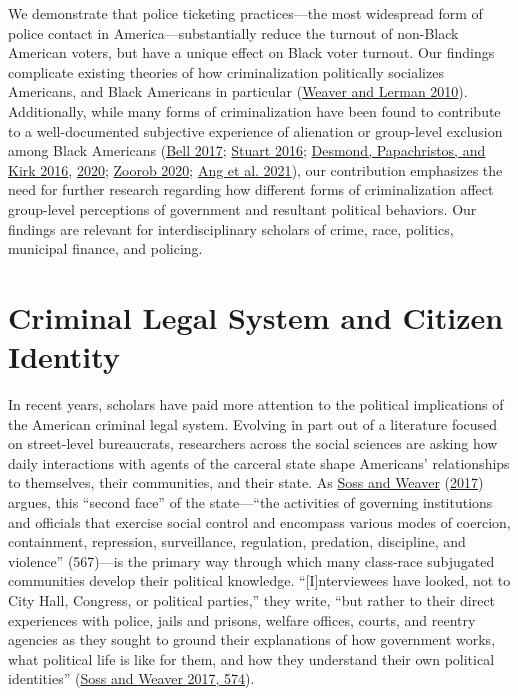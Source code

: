 \documentclass[
  12pt,
]{article}
\begin{document}
We demonstrate that police ticketing practices---the most widespread form of police contact in America---substantially reduce the turnout of non-Black American voters, but have a unique effect on Black voter turnout. Our findings complicate existing theories of how criminalization politically socializes Americans, and Black Americans in particular (\protect\hyperlink{ref-Weaver2010}{Weaver and Lerman 2010}). Additionally, while many forms of criminalization have been found to contribute to a well-documented subjective experience of alienation or group-level exclusion among Black Americans (\protect\hyperlink{ref-Bell2017}{Bell 2017}; \protect\hyperlink{ref-Stuart2016}{Stuart 2016}; \protect\hyperlink{ref-Desmond2016}{Desmond, Papachristos, and Kirk 2016}, \protect\hyperlink{ref-Desmond2020}{2020}; \protect\hyperlink{ref-Zoorob2020}{Zoorob 2020}; \protect\hyperlink{ref-Ang2021}{Ang et al. 2021}), our contribution emphasizes the need for further research regarding how different forms of criminalization affect group-level perceptions of government and resultant political behaviors. Our findings are relevant for interdisciplinary scholars of crime, race, politics, municipal finance, and policing.

\hypertarget{criminal-legal-system-and-citizen-identity}{%
\section*{Criminal Legal System and Citizen Identity}\label{criminal-legal-system-and-citizen-identity}}

In recent years, scholars have paid more attention to the political implications of the American criminal legal system. Evolving in part out of a literature focused on street-level bureaucrats, researchers across the social sciences are asking how daily interactions with agents of the carceral state shape Americans' relationships to themselves, their communities, and their state. As \protect\hyperlink{ref-Soss2017}{Soss and Weaver} (\protect\hyperlink{ref-Soss2017}{2017}) argues, this ``second face'' of the state---``the activities of governing institutions and officials that exercise social control and encompass various modes of coercion, containment, repression, surveillance, regulation, predation, discipline, and violence'' (567)---is the primary way through which many class-race subjugated communities develop their political knowledge. ``{[}I{]}nterviewees have looked, not to City Hall, Congress, or political parties,'' they write, ``but rather to their direct experiences with police, jails and prisons, welfare offices, courts, and reentry agencies as they sought to ground their explanations of how government works, what political life is like for them, and how they understand their own political identities'' (\protect\hyperlink{ref-Soss2017}{Soss and Weaver 2017, 574}).
\end{document}

